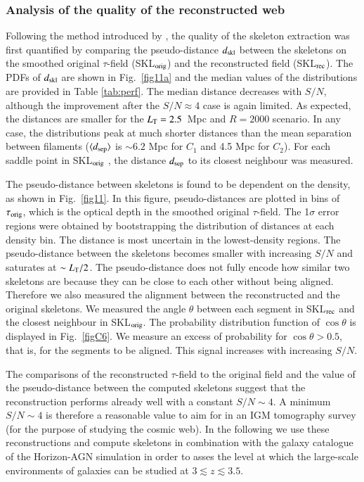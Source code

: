 \documentclass{aa}
\begin{document}
\subsubsection{Analysis of the quality of the reconstructed web}
Following the method introduced by \cite{Sousbie2011}, the quality of the skeleton extraction was first quantified by comparing the pseudo-distance $d_{\rm skl}$ between the skeletons on the smoothed original $\tau$-field (SKL$_{\rm orig}$) and the reconstructed field (SKL$_{\rm rec}$). The PDFs of $d_{\rm skl}$ are shown in Fig.~\ref{fig11a} and the median values of the distributions are provided in Table \ref{tab:perf}. The median distance decreases with $S/N$, although the improvement after the $S/N\approx$4 case is again limited. As expected, the distances are smaller for the $L_{\rm T}=2.5$~Mpc and $R=2000$ scenario. In any case, the distributions peak at much shorter distances than the mean separation between filaments ($\langle d_{\rm sep} \rangle$ is  $\sim 6.2$ Mpc for $C_{1}$ and 4.5 Mpc for $C_{2}$). For each saddle point in  SKL$_{\rm orig}$ , the distance $d_{\rm sep}$ to its closest neighbour was measured.  

The pseudo-distance between skeletons is found to be dependent on the density, as shown in Fig.~\ref{fig11}. In this figure, pseudo-distances are plotted in bins of $\tau_{\rm orig}$, which is the optical depth in the smoothed original $\tau$-field. The 1$\sigma$ error regions were obtained by bootstrapping the distribution of distances at each density  bin. The distance is most uncertain in the lowest-density regions. The pseudo-distance between the skeletons becomes smaller with increasing $S/N$ and saturates at $\sim L_{\rm T}/2$. The pseudo-distance does not fully encode how similar two skeletons are because they can be close to each other without being aligned. Therefore we also measured the alignment between the reconstructed and the original skeletons. We measured the angle $\theta$ between each segment in SKL$_{\rm rec}$ and the closest neighbour in SKL$_{\rm orig}$. The probability distribution function of $\cos \theta$ is displayed in Fig.~\ref{figC6}. We measure an excess of probability for $\cos \theta  > 0.5$, that is, for the segments to be aligned. This signal increases with increasing $S/N$. 

The comparisons of the reconstructed $\tau$-field to the original field and the value of the pseudo-distance between the computed skeletons  suggest that the reconstruction performs already well with a constant $S/N\sim4$. A minimum $S/N\sim4$ is therefore a reasonable value to aim for in an IGM tomography survey (for the purpose of studying the cosmic web). In the following we use these reconstructions and compute skeletons in combination with the galaxy catalogue of the {\sc Horizon-AGN} simulation in order to asses the level at which the large-scale environments of galaxies can be studied at $3 \lesssim z \lesssim 3.5$.
\end{document}
